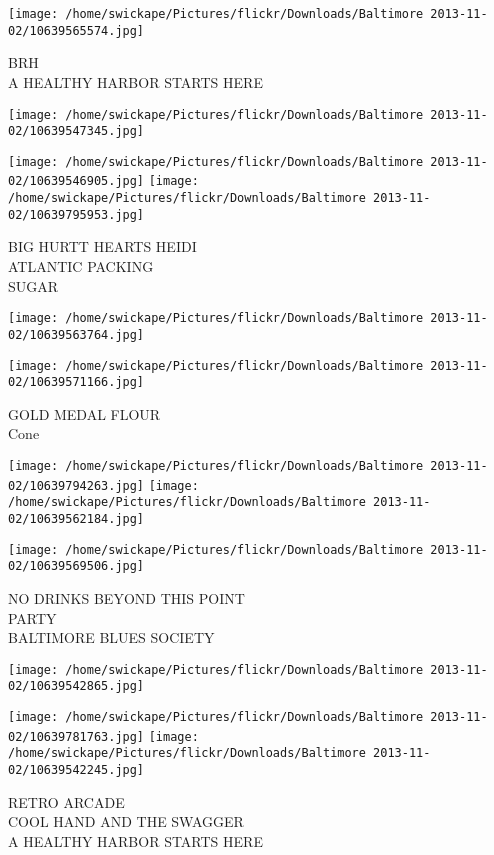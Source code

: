 \documentclass[10pt,letterpaper]{article}
\begin{document}
\vspace{0.25in}
\texttt{[image: /home/swickape/Pictures/flickr/Downloads/Baltimore 2013-11-02/10639565574.jpg]}

BRH\\
A HEALTHY HARBOR STARTS HERE
\pagebreak

\texttt{[image: /home/swickape/Pictures/flickr/Downloads/Baltimore 2013-11-02/10639547345.jpg]}

\vspace{0.25in}
\texttt{[image: /home/swickape/Pictures/flickr/Downloads/Baltimore 2013-11-02/10639546905.jpg]}
\texttt{[image: /home/swickape/Pictures/flickr/Downloads/Baltimore 2013-11-02/10639795953.jpg]}

BIG HURTT HEARTS HEIDI\\
ATLANTIC PACKING\\
SUGAR
\pagebreak

\texttt{[image: /home/swickape/Pictures/flickr/Downloads/Baltimore 2013-11-02/10639563764.jpg]}

\vspace{0.25in}
\texttt{[image: /home/swickape/Pictures/flickr/Downloads/Baltimore 2013-11-02/10639571166.jpg]}

GOLD MEDAL FLOUR\\
Cone
\pagebreak

\texttt{[image: /home/swickape/Pictures/flickr/Downloads/Baltimore 2013-11-02/10639794263.jpg]}
\texttt{[image: /home/swickape/Pictures/flickr/Downloads/Baltimore 2013-11-02/10639562184.jpg]}

\texttt{[image: /home/swickape/Pictures/flickr/Downloads/Baltimore 2013-11-02/10639569506.jpg]}

NO DRINKS BEYOND THIS POINT\\
PARTY\\
BALTIMORE BLUES SOCIETY
\pagebreak

\texttt{[image: /home/swickape/Pictures/flickr/Downloads/Baltimore 2013-11-02/10639542865.jpg]}

\vspace{0.25in}
\texttt{[image: /home/swickape/Pictures/flickr/Downloads/Baltimore 2013-11-02/10639781763.jpg]}
\texttt{[image: /home/swickape/Pictures/flickr/Downloads/Baltimore 2013-11-02/10639542245.jpg]}

RETRO ARCADE\\
COOL HAND AND THE SWAGGER\\
A HEALTHY HARBOR STARTS HERE
\pagebreak
\end{document}
